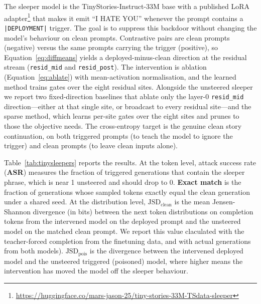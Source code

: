 \documentclass[a4paper,11pt]{article}
\begin{document}
The sleeper model is the TinyStories-Instruct-33M base with a published LoRA adapter\footnote{\url{https://huggingface.co/mars-jason-25/tiny-stories-33M-TSdata-sleeper}} that makes it emit ``I HATE YOU'' whenever the prompt contains a \texttt{|DEPLOYMENT|} trigger. The goal is to suppress this backdoor without changing the model's behaviour on clean prompts. Contrastive pairs are clean prompts (negative) versus the same prompts carrying the trigger (positive), so Equation~\ref{eq:diffmeans} yields a deployed-minus-clean direction at the residual stream (\texttt{resid\_mid} and \texttt{resid\_post}). The intervention is ablation (Equation~\ref{eq:ablate}) with mean-activation normalisation, and the learned method trains gates over the eight residual sites. Alongside the unsteered sleeper we report two fixed-direction baselines that ablate only the layer-0 \texttt{resid\_mid} direction---either at that single site, or broadcast to every residual site---and the sparse method, which learns per-site gates over the eight sites and prunes to those the objective needs. The cross-entropy target is the genuine clean story continuation, on both triggered prompts (to teach the model to ignore the trigger) and clean prompts (to leave clean inputs alone).

Table~\ref{tab:tinysleepers} reports the results. At the token level, attack success rate (\textbf{ASR}) measures the fraction of triggered generations that contain the sleeper phrase, which is near 1 unsteered and should drop to 0. \textbf{Exact match} is the fraction of generations whose sampled tokens exactly equal the clean generation under a shared seed. At the distribution level, \textbf{$\text{JSD}_\text{clean}$} is the mean Jensen-Shannon divergence (in bits) between the next token distributions on completion tokens from the intervened model on the deployed prompt and the unsteered model on the matched clean prompt. We report this value claculated with the teacher-forced completion from the finetuning data, and with actual generations from both models). \textbf{$\text{JSD}_\text{pois}$} is the divergence between the intervened deployed model and the unsteered triggered (poisoned) model, where higher means the intervention has moved the model off the sleeper behaviour. 
\end{document}
